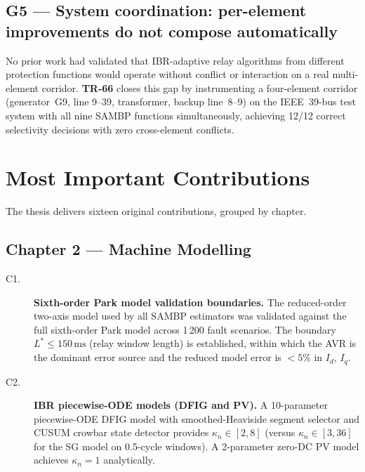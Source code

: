 \documentclass
    [phd,synopsis]
    {iitmdissertation}
\newcommand{\kn}{\kappa_n}
\begin{document}
\subsection*{G5 — System coordination: per-element improvements do not
  compose automatically}

No prior work had validated that IBR-adaptive relay algorithms from
different protection functions would operate without conflict or interaction
on a real multi-element corridor.
\textbf{TR-66} closes this gap by instrumenting a four-element corridor
(generator~G9, line 9--39, transformer, backup line~8--9) on the
IEEE~39-bus test system with all nine SAMBP functions simultaneously,
achieving 12/12 correct selectivity decisions with zero cross-element
conflicts.

\section{Most Important Contributions}

The thesis delivers sixteen original contributions, grouped by chapter.

\subsection*{Chapter 2 — Machine Modelling}

\begin{description}
  \item[C1.] \textbf{Sixth-order Park model validation boundaries.}
    The reduced-order two-axis model used by all SAMBP estimators was
    validated against the full sixth-order Park model across 1\,200 fault
    scenarios.
    The boundary $L^* \leq 150\,\text{ms}$ (relay window length) is
    established, within which the AVR is the dominant error source and
    the reduced model error is $< 5\%$ in $I_d$, $I_q$.

  \item[C2.] \textbf{IBR piecewise-ODE models (DFIG and PV).}
    A 10-parameter piecewise-ODE DFIG model with smoothed-Heaviside segment
    selector and CUSUM crowbar state detector provides $\kn \in [2, 8]$
    (versus $\kn \in [3, 36]$ for the SG model on 0.5-cycle windows).
    A 2-parameter zero-DC PV model achieves $\kn = 1$ analytically.
\end{description}
\end{document}
